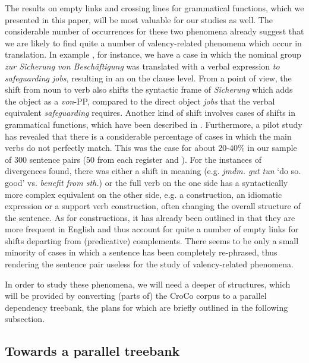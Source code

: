 \documentclass[output=paper]{LSP/langsci}
\begin{document}
The results on empty links and crossing lines for grammatical functions, which we presented in this paper, will be most valuable for our  studies as well. The considerable number of occurrences for these two phenomena already suggest that we are likely to find quite a number of valency-related phenomena which occur in translation. In example , for instance, we have a case in which the nominal group \textit{zur Sicherung von Beschäftigung} was translated with a verbal expression \textit{to safeguarding jobs}, resulting in an  on the clause level. From a  point of view, the shift from noun to verb also shifts the syntactic  frame of \textit{Sicherung} which adds the object as a \textit{von}{}-PP, compared to the direct object \textit{jobs} that the verbal equivalent \textit{safeguarding} requires. Another kind of  shift involves cases of shifts in grammatical functions, which have been described in . Furthermore, a pilot study has revealed that there is a considerable percentage of cases in which the main verbs do not perfectly match. This was the case for about 20-40\% in our sample of 300 sentence pairs (50 from each register and ). For the instances of divergences found, there was either a shift in meaning (e.g. \textit{jmdm. gut tun} `do so. good' vs. \textit{benefit from sth.}) or the full verb on the one side has a syntactically more complex equivalent on the other side, e.g. a  construction, an idiomatic expression or a support verb construction, often changing the overall structure of the sentence. As for  constructions, it has already been outlined in  that they are more frequent in English and thus account for quite a number of empty links for shifts departing from (predicative) complements. There seems to be only a small minority of cases in which a sentence has been completely re-phrased, thus rendering the sentence pair useless for the study of valency-related phenomena.

In order to study these phenomena, we will need a deeper  of structures, which will be provided by converting (parts of) the CroCo corpus to a parallel dependency treebank, the plans for which are briefly outlined in the following subsection.

\subsection{Towards a parallel treebank}\label{sec:culo:5.2}
\end{document}
